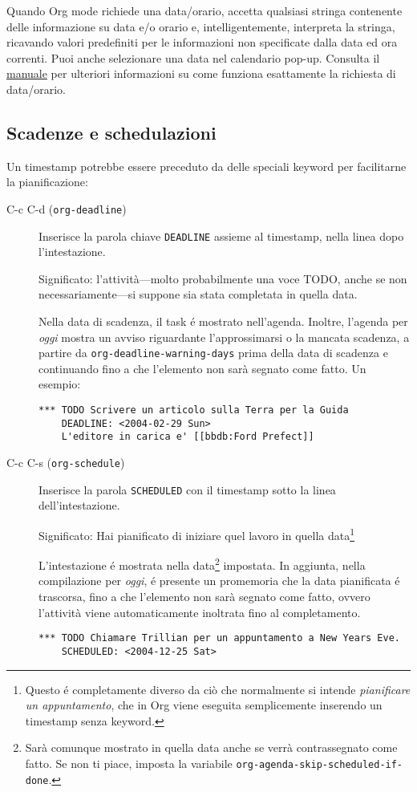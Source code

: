 \documentclass[11pt]{article}
\begin{document}
Quando Org mode richiede una data/orario, accetta qualsiasi stringa
contenente delle informazione su data e/o orario e, intelligentemente,
interpreta la stringa, ricavando valori predefiniti per le
informazioni non specificate dalla data ed ora correnti. Puoi anche
selezionare una data nel calendario pop-up. Consulta il \href{org}{manuale} per
ulteriori informazioni su come funziona esattamente la richiesta di
data/orario.

\subsection{Scadenze e schedulazioni}
\label{sec:org0a9a3f3}
Un timestamp potrebbe essere preceduto da delle speciali keyword per
facilitarne la pianificazione:

\begin{description}
\item[{C-c C-d (\texttt{org-deadline})}] Inserisce la parola chiave \texttt{DEADLINE} assieme al timestamp, nella
linea dopo l'intestazione.

Significato: l'attività---molto probabilmente una voce TODO, anche se
non necessariamente---si suppone sia stata completata in quella
data.

Nella data di scadenza, il task é mostrato nell'agenda. Inoltre,
l'agenda per \emph{oggi} mostra un avviso riguardante l'approssimarsi o
la mancata scadenza, a partire da \texttt{org-deadline-warning-days} prima
della data di scadenza e continuando fino a che l'elemento non sarà
segnato come fatto. Un esempio:

\begin{verbatim}
*** TODO Scrivere un articolo sulla Terra per la Guida
    DEADLINE: <2004-02-29 Sun>
    L'editore in carica e' [[bbdb:Ford Prefect]]
\end{verbatim}

\item[{C-c C-s (\texttt{org-schedule})}] Inserisce la parola \texttt{SCHEDULED} con il timestamp sotto la linea
dell'intestazione.

Significato: Hai pianificato di iniziare quel lavoro in quella data\footnote{Questo é completamente diverso da ciò che normalmente si intende
\emph{pianificare un appuntamento}, che in Org viene eseguita semplicemente
inserendo un timestamp senza keyword.}

L'intestazione é mostrata nella data\footnote{Sarà comunque mostrato in quella data anche se verrà
contrassegnato come fatto. Se non ti piace, imposta la variabile
\texttt{org-agenda-skip-scheduled-if-done}.} impostata. In aggiunta, nella
compilazione per \emph{oggi}, é presente un promemoria che la data
pianificata é trascorsa, fino a che l'elemento non sarà segnato come
fatto, ovvero l'attività viene automaticamente inoltrata fino al
completamento.

\begin{verbatim}
*** TODO Chiamare Trillian per un appuntamento a New Years Eve.
    SCHEDULED: <2004-12-25 Sat>
\end{verbatim}
\end{description}
\end{document}
